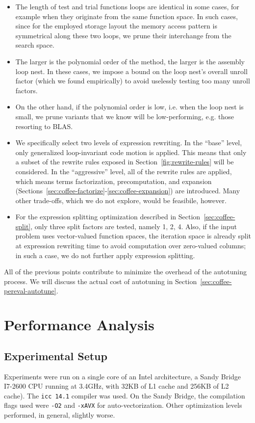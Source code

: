 \begin{itemize}
\item The length of test and trial functions loops are identical in some cases, for example when they originate from the same function space. In such cases, since for the employed storage layout the memory access pattern is symmetrical along these two loops, we prune their interchange from the search space. 
\item The larger is the polynomial order of the method, the larger is the assembly loop nest. In these cases, we impose a bound on the loop nest's overall unroll factor (which we found empirically) to avoid uselessly testing too many unroll factors. 
\item On the other hand, if the polynomial order is low, i.e. when the loop nest is small, we prune variants that we know will be low-performing, e.g. those resorting to BLAS.
\item We specifically select two levels of expression rewriting. In the ``base'' level, only generalized loop-invariant code motion is applied. This means that only a subset of the rewrite rules exposed in Section~\ref{fig:rewrite-rules} will be considered. In the ``aggressive'' level, all of the rewrite rules are applied, which means terms factorization, precomputation, and expansion (Sections~\ref{sec:coffee-factorize}-\ref{sec:coffee-expansion}) are introduced. Many other trade-offs, which we do not explore, would be feasibile, however. 
\item For the expression splitting optimization described in Section~\ref{sec:coffee-split}, only three split factors are tested, namely 1, 2, 4. Also, if the input problem uses vector-valued function spaces, the iteration space is already split at expression rewriting time to avoid computation over zero-valued columns; in such a case, we do not further apply expression splitting.
\end{itemize}

All of the previous points contribute to minimize the overhead of the autotuning process. We will discuss the actual cost of autotuning in Section~\ref{sec:coffee-pereval-autotune}.

\section{Performance Analysis}
\label{sec:coffee-perfeval}

\subsection{Experimental Setup}
\label{sec:coffee-perfeval-setup}
Experiments were run on a single core of an Intel architecture, a Sandy Bridge I7-2600 CPU running at 3.4GHz, with 32KB of L1 cache and 256KB of L2 cache). The \texttt{icc 14.1}  compiler was used. On the Sandy Bridge, the compilation flags used were \texttt{-O2} and \texttt{-xAVX} for auto-vectorization. Other optimization levels performed, in general, slightly worse.

